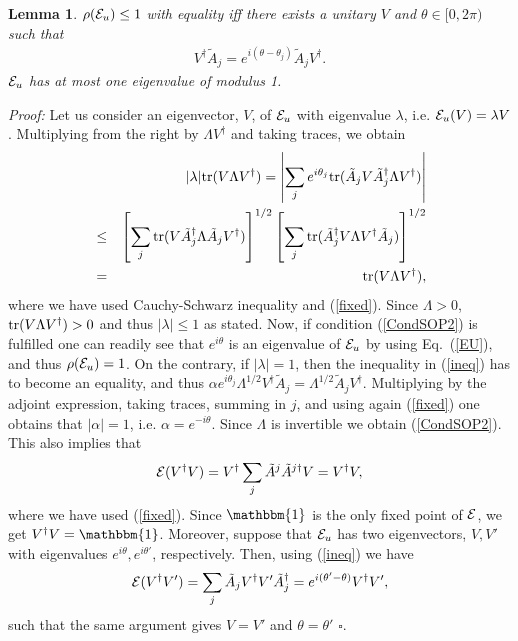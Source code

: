 \documentclass[prl,floatfix,showpacs,amsmat,twocolumn]{revtex4}
\newtheorem{lemma}{Lemma}
\newcommand{\be}{\begin{eqnarray}}
\newcommand{\ee}{\end{eqnarray}}
\newcommand{\bea}{\begin{eqnarray}}
\newcommand{\eea}{\end{eqnarray}}
\newcommand{\1}{\mathbbm{1}}
\renewcommand{\>}{\rangle}
\newcommand{\<}{\langle}
\begin{document}
\begin{lemma} $\rho({\cal E}_u)\le 1$ with equality iff there exists a unitary $V$
    and $\theta\in[0,2\pi)$ such that
    \be
        \label{CondSOP2}
        V^\dagger \tilde A_j = e^{i(\theta-\theta_j)}  \tilde A_j
        V^\dagger.
    \ee
    ${\cal E}_u$ has at most one eigenvalue of modulus 1.
\end{lemma}
{\em Proof:} Let us consider an eigenvector, $V$, of ${\cal E}_u$
with eigenvalue $\lambda$, i.e. ${\cal E}_u(V)=\lambda V$.
Multiplying from the right by $\Lambda V^\dagger$ and taking
traces, we obtain
\bea
    && |\lambda|{\rm tr}(V\Lambda V^\dagger)=\left|\sum_j e^{i\theta_j}{\rm
            tr}(\tilde A_jV\tilde A_j^{\dagger}\Lambda V^\dagger)\right| \nonumber\\
    &\le& \left[\sum_j {\rm
            tr}(V\tilde A_j^{\dagger}\Lambda \tilde A_j V^\dagger)\right]^{1/2}
    \left[\sum_j {\rm tr}(\tilde A_j^{\dagger}V\Lambda V^\dagger\tilde A_j
        )\right]^{1/2} \nonumber\\
    &=&{\rm tr}(V\Lambda V^\dagger),
    \label{ineq}
\eea
where we have used Cauchy-Schwarz inequality and (\ref{fixed}).
Since $\Lambda>0$, ${\rm tr}(V\Lambda V^\dagger)>0$ and thus
$|\lambda|\le 1$ as stated. Now, if condition (\ref{CondSOP2}) is
fulfilled one can readily see that $e^{i\theta}$ is an eigenvalue
of ${\cal E}_u$ by using Eq.\ (\ref{EU}), and thus $\rho({\cal
        E}_u)= 1$. On the contrary, if $|\lambda|=1$, then the inequality
in (\ref{ineq}) has to become an equality, and thus $\alpha
    e^{i\theta_j}\Lambda^{1/2} V^\dagger \tilde A_j =\Lambda^{1/2}
    \tilde A_j V^\dagger$. Multiplying by the adjoint expression,
taking traces, summing in $j$, and using again (\ref{fixed}) one
obtains that $|\alpha|=1$, i.e. $\alpha=e^{-i\theta}$. Since
$\Lambda$ is invertible we obtain (\ref{CondSOP2}). This also
implies that
\be
{\cal E}(V^\dagger V)=V^\dagger\sum_j \tilde A^j \tilde A^{j\dagger}
V=V^{\dagger} V,
\ee
where we have used (\ref{fixed}). Since $\1$ is
the only fixed point of ${\cal E}$, we get $V^\dagger V=\1$.
Moreover, suppose that ${\cal E}_u$ has two eigenvectors, $V,V'$
with eigenvalues $e^{i\theta},e^{i\theta'}$, respectively. Then,
using (\ref{ineq}) we have
\be
{\cal E}(V^\dagger V')=\sum_j \tilde A_jV^\dagger V' \tilde
A_j^\dagger=e^{i(\theta'-\theta)} V^\dagger V',
\ee
such that the same argument gives $V=V'$ and $\theta=\theta'$
$\square$.
\end{document}
